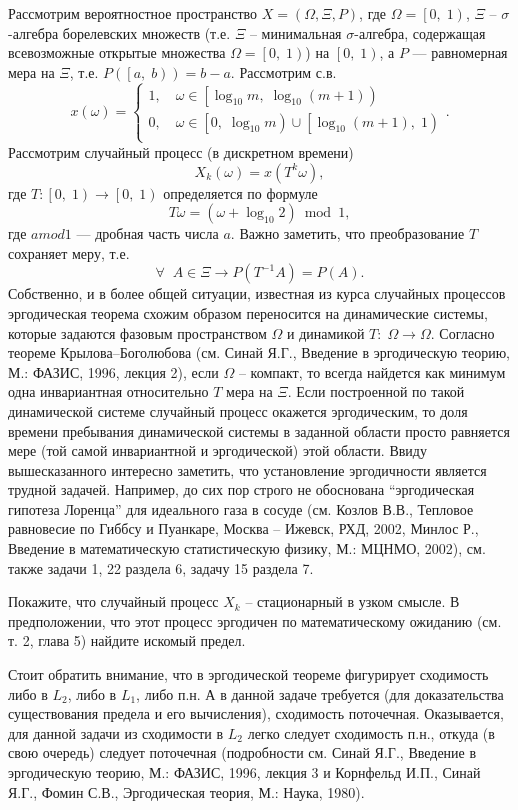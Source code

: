 \begin{ordre} Рассмотрим вероятностное пространство $X=\left( \Omega ,\Xi ,P\right)$, где $\Omega =\left[ {0,\;1} \right)$, $\Xi $ 
-- $\sigma $-алгебра борелевских множеств (т.е. $\Xi $ -- минимальная 
$\sigma $-алгебра, содержащая всевозможные открытые множества $\Omega 
=\left[ {0,\;1} \right)$) на $\left[ {0,\;1} \right)$, а $P$ --- равномерная 
мера на $\Xi $, т.е. $P\left( {\left[ {a,\;b} \right)} \right)=b-a$. 
Рассмотрим с.в.
\[
x\left( \omega \right)=\left\{ {\begin{array}{l}
 1,\quad \omega \in \left[ {\log _{10} m,\;\log _{10} \left( {m+1} \right)} 
\right) \\ 
 0,\quad \omega \in \left[ {0,\;\log _{10} m} \right)\cup \left[ {\log _{10} 
\left( {m+1} \right),\;1} \right) \\ 
 \end{array}} \right..
\]
Рассмотрим случайный процесс (в дискретном времени)
$$X_k \left( \omega \right)=x\left( {T^k\omega } \right),$$ где $T:\left[ 
{0,\;1} \right)\to \left[ {0,\;1} \right)$ определяется по формуле 
 $$T\omega =\left( {\omega +\log _{10} 2} 
\right) \bmod 1,$$ 
где $a mod 1$ --- дробная часть числа $a$.
Важно заметить, что преобразование $T$ сохраняет меру, т.е. $$\forall 
\;\;A\in \Xi \to P\left( {T^{-1}A} \right)=P\left( A \right).$$ Собственно, и 
в более общей ситуации, известная из курса случайных процессов эргодическая 
теорема схожим образом переносится на динамические системы, которые задаются 
фазовым пространством $\Omega $ и динамикой $T:\;\Omega \to \Omega $. 
Согласно теореме Крылова--Боголюбова (см. Синай Я.Г., Введение в 
эргодическую теорию, М.: ФАЗИС, 1996, лекция 2), если $\Omega $ --  компакт, 
то всегда найдется как минимум одна инвариантная относительно $T$ мера на 
$\Xi $. Если построенной по такой динамической системе случайный процесс 
окажется эргодическим, то доля времени пребывания динамической системы в 
заданной области просто равняется мере (той самой инвариантной и 
эргодической) этой области. Ввиду вышесказанного интересно заметить, что 
установление эргодичности является трудной задачей. Например, до сих пор строго не 
обоснована ``эргодическая гипотеза Лоренца'' для идеального газа в сосуде 
(см. Козлов В.В., Тепловое равновесие по Гиббсу и Пуанкаре, Москва -- 
Ижевск, РХД, 2002, Минлос Р., Введение в математическую статистическую 
физику, М.: МЦНМО, 2002), см. также задачи 1, 22 раздела 6, задачу 15 раздела 7.

Покажите, что случайный процесс $X_k $ -- стационарный в узком смысле. В 
предположении, что этот процесс эргодичен по математическому 
ожиданию (см. \cite{21} т. 2, глава 5) 
 найдите искомый предел.
 
Стоит обратить внимание, что в 
эргодической теореме фигурирует сходимость либо в $L_2$, либо в $L_1 $, 
либо п.н. А в данной задаче требуется (для доказательства существования 
предела и его вычисления), сходимость поточечная. Оказывается, для данной 
задачи из сходимости в $L_2 $ легко следует сходимость п.н., откуда (в свою 
очередь) следует поточечная (подробности см. Синай  Я.Г., Введение в 
эргодическую теорию, М.: ФАЗИС, 1996, лекция 3 и  Корнфельд И.П.,  Синай Я.Г., 
 Фомин С.В., Эргодическая теория, М.: Наука, 1980).
\end{ordre}
